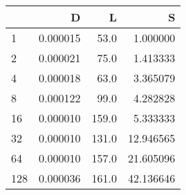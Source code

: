 \begin{tabular}{lrrr}
\toprule
{} &         D &      L &          S \\
\midrule
1   &  0.000015 &   53.0 &   1.000000 \\
2   &  0.000021 &   75.0 &   1.413333 \\
4   &  0.000018 &   63.0 &   3.365079 \\
8   &  0.000122 &   99.0 &   4.282828 \\
16  &  0.000010 &  159.0 &   5.333333 \\
32  &  0.000010 &  131.0 &  12.946565 \\
64  &  0.000010 &  157.0 &  21.605096 \\
128 &  0.000036 &  161.0 &  42.136646 \\
\bottomrule
\end{tabular}

